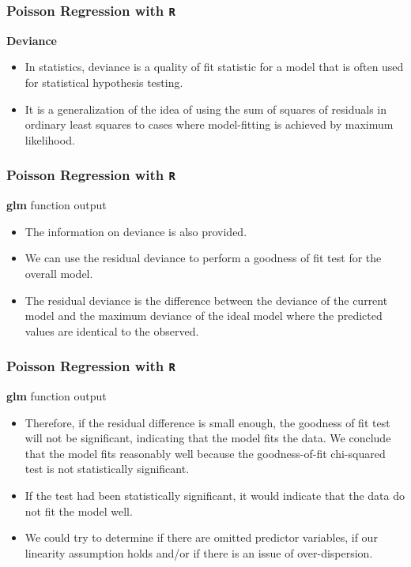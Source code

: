 \documentclass[00-GLMregslides.tex]{subfiles}
\begin{document}
\begin{frame}[fragile]
\frametitle{Poisson Regression with \texttt{R}}
\Large 
\textbf{Deviance}
\begin{itemize}
\item In statistics, deviance is a quality of fit statistic for a model that is often used for statistical 
hypothesis testing. 
\item It is a generalization of the idea of using the sum of squares of 
residuals in ordinary least squares to cases where model-fitting is achieved by maximum likelihood.
\end{itemize}
\end{frame}
\begin{frame}[fragile]
\frametitle{Poisson Regression with \texttt{R}}
\Large 
\textbf{glm} function output
\begin{itemize}
\item The information on deviance is also provided. 
\item We can use the residual deviance to perform a goodness of fit test for the overall model. 
\item The residual deviance is the difference between the deviance of the current model and the maximum deviance of the ideal model where the predicted values are identical to the observed. 
\end{itemize}
\end{frame}
\begin{frame}[fragile]
\frametitle{Poisson Regression with \texttt{R}}
\Large 
\textbf{glm} function output
\begin{itemize}
\item Therefore, if the residual difference is small enough, the goodness of fit test will not be significant, indicating that the model fits the data. We conclude that the model fits reasonably well because the goodness-of-fit chi-squared test is not statistically significant. 
\item If the test had been statistically significant, it would indicate that the data do not fit the model well. 
\item We could try to determine if there are omitted predictor variables, if our linearity assumption holds and/or if there is an issue of over-dispersion. 
\end{itemize}
\end{frame}
\end{document}
